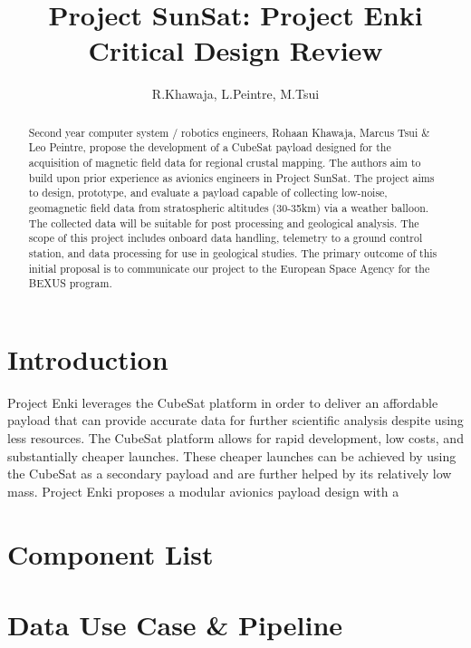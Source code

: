 \documentclass[11pt, a4paper]{article}
\title{Project SunSat: Project Enki \\ \textbf{Critical Design Review}}
\author{R.Khawaja, L.Peintre, M.Tsui}
\date{}
\begin{document}

\maketitle

\begin{abstract}
  Second year computer system / robotics engineers, Rohaan Khawaja, Marcus Tsui \& Leo Peintre, propose the development of a CubeSat payload designed for the acquisition of magnetic field data for regional crustal mapping. The authors aim to build upon prior experience as avionics engineers in Project SunSat. The project aims to design, prototype, and evaluate a payload capable of collecting low-noise, geomagnetic field data from stratospheric altitudes (30-35km) via a weather balloon. The collected data will be suitable for post processing and geological analysis. The scope of this project includes onboard data handling, telemetry to a ground control station, and data processing for use in geological studies. The primary outcome of this initial proposal is to communicate our project to the European Space Agency for the BEXUS program.

\end{abstract}

\tableofcontents
\pagebreak

\pagestyle{fancy}
\fancyhf{}
\fancyfoot[C]{\thepage}

\section{Introduction}
Project Enki leverages the CubeSat platform in order to deliver an affordable payload that can provide accurate data for further scientific analysis despite using less resources. The CubeSat platform allows for rapid development, low costs, and substantially cheaper launches. These cheaper launches can be achieved by using the CubeSat as a secondary payload and are further helped by its relatively low mass.
Project Enki proposes a modular avionics payload design with a
\section{Component List}

\section{Data Use Case \& Pipeline}
\end{document}
